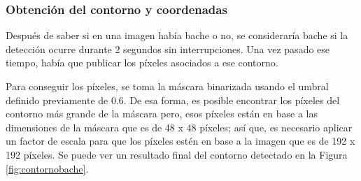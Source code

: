 \subsubsection{Obtención del contorno y coordenadas}
\label{subsec:contornoycoordenadas}

Después de saber si en una imagen había bache o no, se consideraría bache si la detección ocurre durante 2 segundos sin interrupciones. Una vez pasado ese tiempo, había que publicar los píxeles asociados a ese contorno. 

Para conseguir los píxeles, se toma la máscara binarizada usando el umbral definido previamente de 0.6. De esa forma, es posible encontrar los píxeles del contorno más grande de la máscara pero, esos píxeles están en base a las dimensiones de la máscara que es de 48 x 48 píxeles; así que, es necesario aplicar un factor de escala para que los píxeles estén en base a la imagen que es de 192 x 192 píxeles. Se puede ver un resultado final del contorno detectado en la Figura \ref{fig:contornobache}.
  

